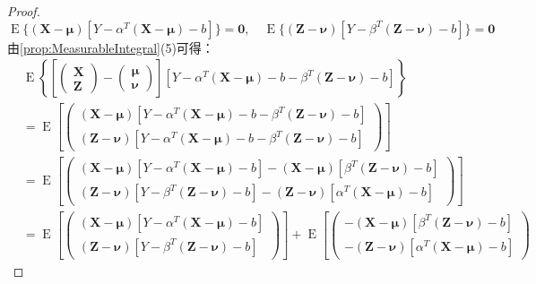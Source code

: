 \begin{proof}
\begin{equation*}
		\operatorname{E}\{(\mathbf{X}-\boldsymbol{\mu})[Y-\alpha^T(\mathbf{X}-\boldsymbol{\mu})-b]\}=\mathbf{0},\quad
		\operatorname{E}\{(\mathbf{Z}-\boldsymbol{\nu})[Y-\beta^T(\mathbf{Z}-\boldsymbol{\nu})-b]\}=\mathbf{0}
	\end{equation*}
	由\cref{prop:MeasurableIntegral}(5)可得：
	\begin{align*}
		&\operatorname{E}\left\{\left[
		\begin{pmatrix}
			\mathbf{X} \\
			\mathbf{Z}
		\end{pmatrix}-
		\begin{pmatrix}
			\boldsymbol{\mu} \\
			\boldsymbol{\nu}
		\end{pmatrix}
		\right][Y-\alpha^T(\mathbf{X}-\boldsymbol{\mu})-b-\beta^T(\mathbf{Z}-\boldsymbol{\nu})-b]\right\} \\
		&=\operatorname{E}\left[
		\begin{pmatrix}
			(\mathbf{X}-\boldsymbol{\mu})[Y-\alpha^T(\mathbf{X}-\boldsymbol{\mu})-b-\beta^T(\mathbf{Z}-\boldsymbol{\nu})-b] \\
			(\mathbf{Z}-\boldsymbol{\nu})[Y-\alpha^T(\mathbf{X}-\boldsymbol{\mu})-b-\beta^T(\mathbf{Z}-\boldsymbol{\nu})-b]
		\end{pmatrix}
		\right] \\
		&=\operatorname{E}\left[
		\begin{pmatrix}
			(\mathbf{X}-\boldsymbol{\mu})[Y-\alpha^T(\mathbf{X}-\boldsymbol{\mu})-b]-(\mathbf{X}-\boldsymbol{\mu})[\beta^T(\mathbf{Z}-\boldsymbol{\nu})-b] \\
			(\mathbf{Z}-\boldsymbol{\nu})[Y-\beta^T(\mathbf{Z}-\boldsymbol{\nu})-b]-(\mathbf{Z}-\boldsymbol{\nu})[\alpha^T(\mathbf{X}-\boldsymbol{\mu})-b]
		\end{pmatrix}
		\right] \\
		&=\operatorname{E}\left[
		\begin{pmatrix}
			(\mathbf{X}-\boldsymbol{\mu})[Y-\alpha^T(\mathbf{X}-\boldsymbol{\mu})-b] \\
			(\mathbf{Z}-\boldsymbol{\nu})[Y-\beta^T(\mathbf{Z}-\boldsymbol{\nu})-b]
		\end{pmatrix}
		\right]+\operatorname{E}\left[
		\begin{pmatrix}
			-(\mathbf{X}-\boldsymbol{\mu})[\beta^T(\mathbf{Z}-\boldsymbol{\nu})-b] \\
			-(\mathbf{Z}-\boldsymbol{\nu})[\alpha^T(\mathbf{X}-\boldsymbol{\mu})-b]
		\end{pmatrix}

\end{align*}
\end{proof}
